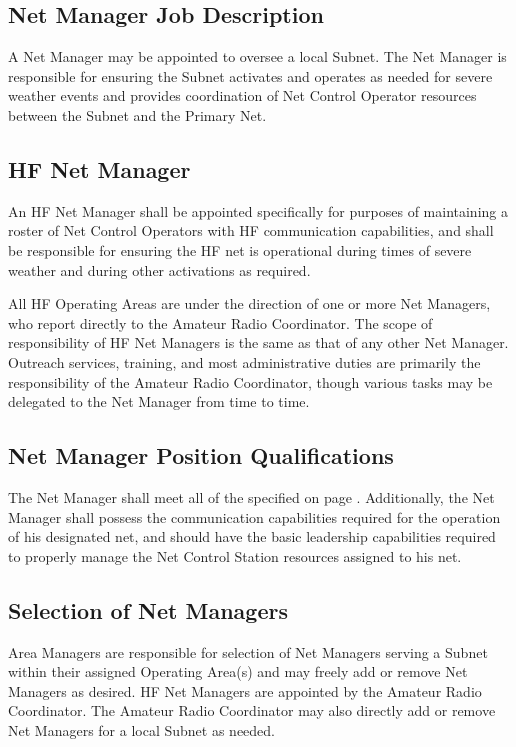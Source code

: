\documentclass[pdflatex,letterpaper,twoside,12pt]{book}
\begin{document}
\subsection{Net Manager Job Description}\label{nm-jobdesc}

A Net Manager may be appointed to oversee a local Subnet.  The Net Manager is responsible for ensuring the Subnet activates and operates as needed for severe weather events and provides coordination of Net Control Operator resources between the Subnet and the Primary Net.

\subsection{HF Net Manager}

An HF Net Manager shall be appointed specifically for purposes of maintaining a roster of Net Control Operators with HF communication capabilities, and shall be responsible for ensuring the HF net is operational during times of severe weather and during other activations as required.

All HF Operating Areas are under the direction of one or more Net Managers, who report directly to the Amateur Radio Coordinator.  The scope of responsibility of HF Net Managers is the same as that of any other Net Manager.  Outreach services, training, and most administrative duties are primarily the responsibility of the Amateur Radio Coordinator, though various tasks may be delegated to the Net Manager from time to time.

\subsection{Net Manager Position Qualifications}

The Net Manager shall meet all of the  specified on page \pageref{nco-criteria}.  Additionally, the Net Manager shall possess the communication capabilities required for the operation of his designated net, and should have the basic leadership capabilities required to properly manage the Net Control Station resources assigned to his net.

\subsection{Selection of Net Managers}

Area Managers are responsible for selection of Net Managers serving a Subnet within their assigned Operating Area(s) and may freely add or remove Net Managers as desired.  HF Net Managers are appointed by the Amateur Radio Coordinator.  The Amateur Radio Coordinator may also directly add or remove Net Managers for a local Subnet as needed.
\end{document}
